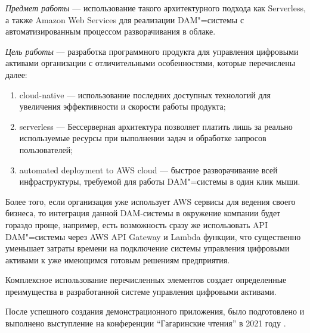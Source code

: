 \textit{Предмет работы} --- использование такого архитектурного подхода как Serverless, а также Amazon Web Services для реализации DAM"=системы с автоматизированным процессом разворачивания в облаке.

\textit{Цель работы} --- разработка программного продукта для управления цифровыми активами организации с отличительными особенностями, которые перечислены далее:
\begin{enumerate}
\item {cloud-native} --- использование последних доступных технологий для увеличения эффективности и скорости работы продукта;

\item {serverless} --- Бессерверная архитектура позволяет платить лишь за реально используемые ресурсы при выполнении задач и обработке запросов пользователей;

\item {automated deployment to AWS cloud} --- быстрое разворачивание всей инфраструктуры, требуемой для работы DAM"=системы в один клик мыши. 
\end{enumerate}

Более того, если организация уже использует AWS сервисы для ведения своего бизнеса, то интеграция данной DAM-системы в окружение компании будет гораздо проще, например, есть возможность сразу же использовать API DAM"=системы через AWS API Gateway и Lambda функции, что существенно уменьшает затраты времени на подключение системы управления цифровыми активами к уже имеющимся готовым решениям предприятия.

Комплексное использование перечисленных элементов создает определенные преимущества в разработанной системе управления цифровыми активами.


После успешного создания демонстрационного приложения, было подготовлено и выполнено выступление на конференции “Гагаринские чтения” в 2021 году  \cite{DamAwsAnreyYuldashev}.
